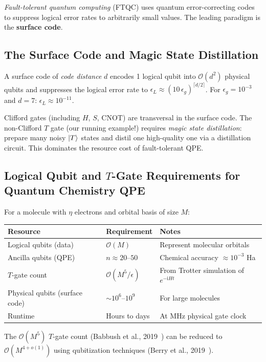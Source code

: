 \documentclass[12pt,a4paper]{article}
\newcommand{\ii}{\mathrm{i}}
\newcommand{\bigO}{\mathcal{O}}
\begin{document}
\emph{Fault-tolerant quantum computing} (FTQC) uses quantum error-correcting
codes to suppress logical error rates to arbitrarily small values.  The
leading paradigm is the \textbf{surface code}.

\subsection{The Surface Code and Magic State Distillation}

A surface code of \emph{code distance} $d$ encodes 1 logical qubit into
$\bigO(d^2)$ physical qubits and suppresses the logical error rate to
$\epsilon_L \approx (10\,\epsilon_g)^{\lceil d/2\rceil}$.  For $\epsilon_g = 10^{-3}$
and $d=7$: $\epsilon_L \approx 10^{-11}$.

Clifford gates (including $H$, $S$, $\text{CNOT}$) are transversal in the
surface code.  The non-Clifford $T$ gate (our running example!) requires
\emph{magic state distillation}: prepare many noisy $\Ket{T}$ states and
distil one high-quality one via a distillation circuit.  This dominates
the resource cost of fault-tolerant QPE.

\subsection{Logical Qubit and \texorpdfstring{$T$}{T}-Gate Requirements for Quantum Chemistry QPE}

For a molecule with $\eta$ electrons and orbital basis of size $M$:
\begin{center}
\begin{tabular}{@{}lll@{}}
\toprule
\textbf{Resource} & \textbf{Requirement} & \textbf{Notes} \\
\midrule
Logical qubits (data)     & $\bigO(M)$ & Represent molecular orbitals \\
Ancilla qubits (QPE)      & $n \approx 20$--$50$ & Chemical accuracy $\approx 10^{-3}$ Ha \\
$T$-gate count            & $\bigO(M^5/\epsilon)$  & From Trotter simulation of $e^{-\ii Ht}$ \\
Physical qubits (surface code) & $\sim 10^6$--$10^9$ & For large molecules \\
Runtime                   & Hours to days & At MHz physical gate clock \\
\bottomrule
\end{tabular}
\end{center}

The $\bigO(M^5)$ $T$-gate count (Babbush et al., 2019~\cite{babbush2019}) can
be reduced to $\bigO(M^{4+o(1)})$ using qubitization techniques (Berry et al., 2019~\cite{berry2019}).
\end{document}
